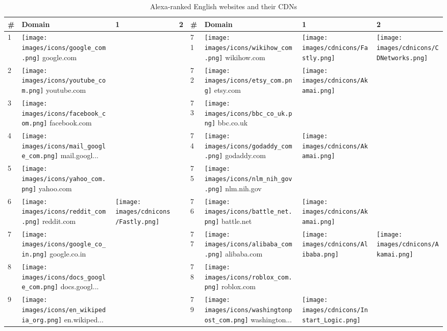 \begin{table}[tbp]
\centering
\caption{Alexa-ranked English websites and their CDNs}
\label{cdn-table}
\begin{tabular}{|llll|llll|}
\hline
\# & Domain & 1 & 2 & \# & Domain & 1 & 2 \\
\hline
1 & \texttt{[image: images/icons/google\_com.png]} google.com & & & 71 & \texttt{[image: images/icons/wikihow\_com.png]} wikihow.com & \texttt{[image: images/cdnicons/Fastly.png]} & \texttt{[image: images/cdnicons/CDNetworks.png]} \\
2 & \texttt{[image: images/icons/youtube\_com.png]} youtube.com & & & 72 & \texttt{[image: images/icons/etsy\_com.png]} etsy.com & \texttt{[image: images/cdnicons/Akamai.png]} & \\
3 & \texttt{[image: images/icons/facebook\_com.png]} facebook.com & & & 73 & \texttt{[image: images/icons/bbc\_co\_uk.png]} bbc.co.uk & & \\
4 & \texttt{[image: images/icons/mail\_google\_com.png]} mail.googl... & & & 74 & \texttt{[image: images/icons/godaddy\_com.png]} godaddy.com & \texttt{[image: images/cdnicons/Akamai.png]} & \\
5 & \texttt{[image: images/icons/yahoo\_com.png]} yahoo.com & & & 75 & \texttt{[image: images/icons/nlm\_nih\_gov.png]} nlm.nih.gov & & \\
6 & \texttt{[image: images/icons/reddit\_com.png]} reddit.com & \texttt{[image: images/cdnicons/Fastly.png]} & & 76 & \texttt{[image: images/icons/battle\_net.png]} battle.net & \texttt{[image: images/cdnicons/Akamai.png]} & \\
7 & \texttt{[image: images/icons/google\_co\_in.png]} google.co.in & & & 77 & \texttt{[image: images/icons/alibaba\_com.png]} alibaba.com & \texttt{[image: images/cdnicons/Alibaba.png]} & \texttt{[image: images/cdnicons/Akamai.png]} \\
8 & \texttt{[image: images/icons/docs\_google\_com.png]} docs.googl... & & & 78 & \texttt{[image: images/icons/roblox\_com.png]} roblox.com & & \\
9 & \texttt{[image: images/icons/en\_wikipedia\_org.png]} en.wikiped... & & & 79 & \texttt{[image: images/icons/washingtonpost\_com.png]} washington... & \texttt{[image: images/cdnicons/Instart\_Logic.png]} & \\

\end{tabular}
\end{table}
